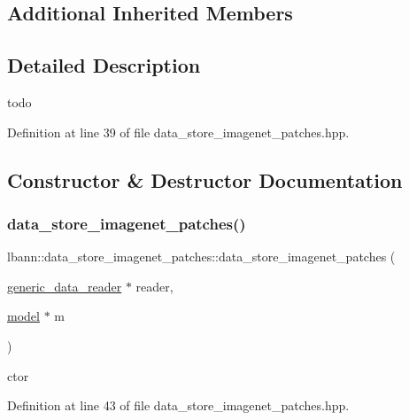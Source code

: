 \subsection*{Additional Inherited Members}


\subsection{Detailed Description}
todo 

Definition at line 39 of file data\+\_\+store\+\_\+imagenet\+\_\+patches.\+hpp.



\subsection{Constructor \& Destructor Documentation}
\mbox{\label{classlbann_1_1data__store__imagenet__patches_ac98e8ba382516df619d24e67881df1eb}} 
\subsubsection{\texorpdfstring{data\+\_\+store\+\_\+imagenet\+\_\+patches()}{data\_store\_imagenet\_patches()}\hspace{0.1cm}{\footnotesize\ttfamily [1/2]}}
{\footnotesize\ttfamily lbann\+::data\+\_\+store\+\_\+imagenet\+\_\+patches\+::data\+\_\+store\+\_\+imagenet\+\_\+patches (\begin{DoxyParamCaption}\item[{\hyperlink{classlbann_1_1generic__data__reader}{generic\+\_\+data\+\_\+reader} $\ast$}]{reader,  }\item[{\hyperlink{classlbann_1_1model}{model} $\ast$}]{m }\end{DoxyParamCaption})\hspace{0.3cm}{\ttfamily [inline]}}



ctor 



Definition at line 43 of file data\+\_\+store\+\_\+imagenet\+\_\+patches.\+hpp.


